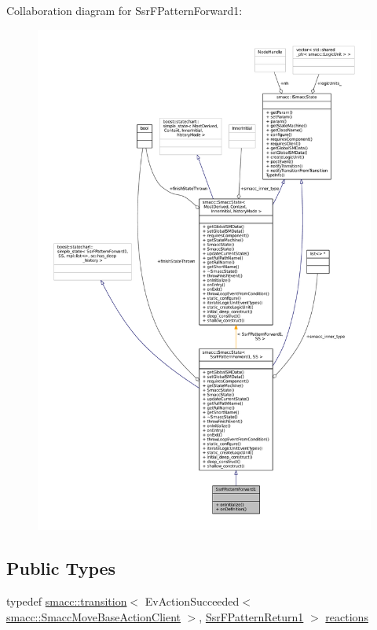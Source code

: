 Collaboration diagram for Ssr\+F\+Pattern\+Forward1\+:
\nopagebreak
\begin{figure}[H]
\begin{center}
\leavevmode
\includegraphics[width=350pt]{structSsrFPatternForward1__coll__graph}
\end{center}
\end{figure}
\subsection*{Public Types}
\begin{DoxyCompactItemize}
\item 
typedef \hyperlink{classsmacc_1_1transition}{smacc\+::transition}$<$ Ev\+Action\+Succeeded$<$ \hyperlink{classsmacc_1_1SmaccMoveBaseActionClient}{smacc\+::\+Smacc\+Move\+Base\+Action\+Client} $>$, \hyperlink{structSsrFPatternReturn1}{Ssr\+F\+Pattern\+Return1} $>$ \hyperlink{structSsrFPatternForward1_a555853f2c6efa80ab1f5c3aa426876d1}{reactions}
\end{DoxyCompactItemize}
